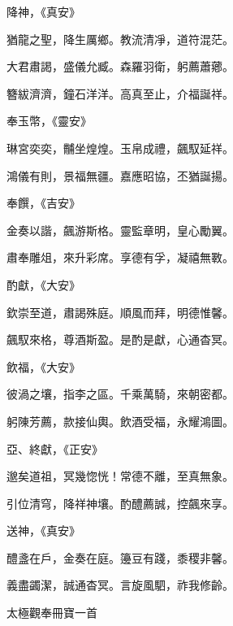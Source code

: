\begin{pinyinscope}
 降神，《真安》



 猶龍之聖，降生厲鄉。教流清凈，道符混茫。



 大君肅謁，盛儀允臧。森羅羽衛，躬薦蕭薌。



 簪紱濟濟，鐘石洋洋。高真至止，介福誕祥。



 奉玉幣，《靈安》



 琳宮奕奕，黼坐煌煌。玉帛成禮，飆馭延祥。



 鴻儀有則，景福無疆。嘉應昭協，丕猶誕揚。



 奉饌，《吉安》



 金奏以諧，飆游斯格。靈監章明，皇心勵翼。



 肅奉雕俎，來升彩席。享德有孚，凝禧無斁。



 酌獻，《大安》



 欽崇至道，肅謁殊庭。順風而拜，明德惟馨。



 飆馭來格，尊酒斯盈。是酌是獻，心通杳冥。



 飲福，《大安》



 彼渦之壤，指李之區。千乘萬騎，來朝密都。



 躬陳芳薦，款接仙輿。飲酒受福，永耀鴻圖。



 亞、終獻，《正安》



 邈矣道祖，冥幾惚恍！常德不離，至真無象。



 引位清穹，降祥神壤。酌醴薦誠，控飆來享。



 送神，《真安》



 醴盞在戶，金奏在庭。籩豆有踐，黍稷非馨。



 義盡蠲潔，誠通杳冥。言旋風駟，祚我修齡。



 太極觀奉冊寶一首




\end{pinyinscope}
